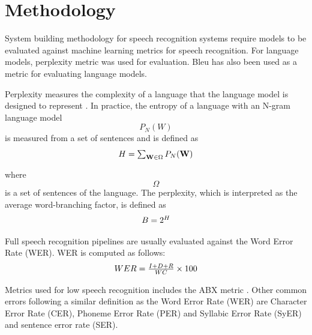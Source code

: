 \section{Methodology}
System building methodology \cite{nunamaker1990systems} for speech recognition systems require models to be evaluated against machine learning metrics for speech recognition.  For language models, perplexity metric was used for evaluation.  Bleu has also been used as a metric for evaluating language models.

Perplexity measures the complexity of a language that the language model is designed to represent \cite{1976jelinekcontinuous}. In practice, the entropy of a language with an N-gram language model $$P_N(W)$$ is measured from a set of sentences and is defined as
\begin{equation}$$H=\sum_{\mathbf{W}\in\Omega}P_N(\mathbf{W})$$
\label{eqn_c2_lm05}
\end{equation}

where $$\Omega$$ is a set of sentences of the language. The perplexity, which is interpreted as the average word-branching factor, is defined as
\begin{equation}$$B=2^H$$
\label{eqn_c2_lm06}
\end{equation}

Full speech recognition pipelines are usually evaluated against the Word Error Rate (WER).  WER is computed as follows:
\begin{equation}\label{eqn_2_3_wer}
$$WER=\frac{I+D+R}{WC}\times 100$$
\end{equation}

Metrics used for low speech recognition includes the ABX metric  \citep{versteegh2015zero}. Other common errors following a similar definition as the Word Error Rate (WER) are Character Error Rate (CER), Phoneme Error Rate (PER) and Syllabic Error Rate (SyER) and sentence error rate (SER).